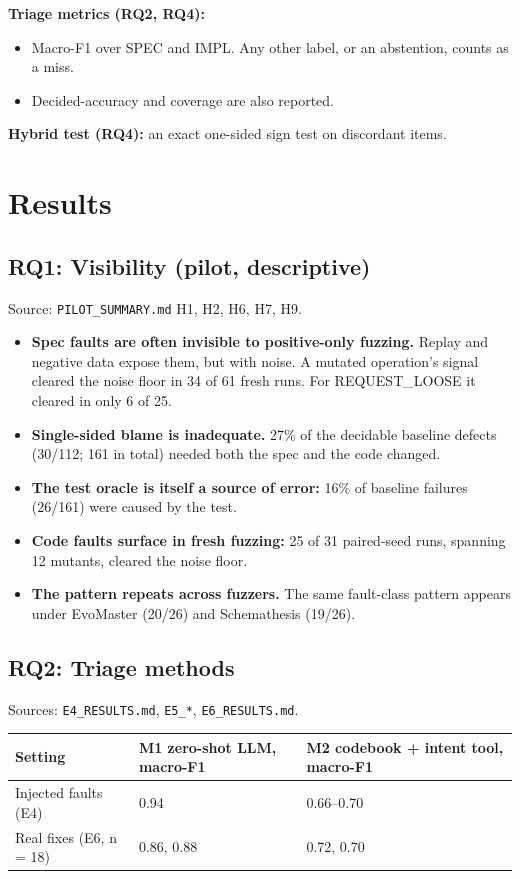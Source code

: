 \documentclass[acmsmall,screen,review,anonymous]{acmart}
\begin{document}
\textbf{Triage metrics (RQ2, RQ4):}
\begin{itemize}
\item Macro-F1 over SPEC and IMPL. Any other label, or an abstention, counts as a miss.
\item Decided-accuracy and coverage are also reported.
\end{itemize}

\textbf{Hybrid test (RQ4):} an exact one-sided sign test on discordant items.

\section{Results}

\subsection{RQ1: Visibility (pilot, descriptive)}
Source: \texttt{PILOT\_SUMMARY.md} H1, H2, H6, H7, H9.
\begin{itemize}
\item \textbf{Spec faults are often invisible to positive-only fuzzing.} Replay and negative data expose them, but with noise. A mutated operation's signal cleared the noise floor in 34 of 61 fresh runs. For REQUEST\_LOOSE it cleared in only 6 of 25.
\item \textbf{Single-sided blame is inadequate.} 27\% of the decidable baseline defects (30/112; 161 in total) needed both the spec and the code changed.
\item \textbf{The test oracle is itself a source of error:} 16\% of baseline failures (26/161) were caused by the test.
\item \textbf{Code faults surface in fresh fuzzing:} 25 of 31 paired-seed runs, spanning 12 mutants, cleared the noise floor.
\item \textbf{The pattern repeats across fuzzers.} The same fault-class pattern appears under EvoMaster (20/26) and Schemathesis (19/26).
\end{itemize}

\subsection{RQ2: Triage methods}
Sources: \texttt{E4\_RESULTS.md}, \texttt{E5\_*}, \texttt{E6\_RESULTS.md}.

\begin{table}[t]
\small
\begin{tabularx}{\linewidth}{lXX}
\toprule
Setting & M1 zero-shot LLM, macro-F1 & M2 codebook + intent tool, macro-F1 \\
\midrule
Injected faults (E4) & 0.94 & 0.66--0.70 \\
Real fixes (E6, n = 18) & 0.86, 0.88 & 0.72, 0.70 \\
\bottomrule
\end{tabularx}
\end{table}
\end{document}
